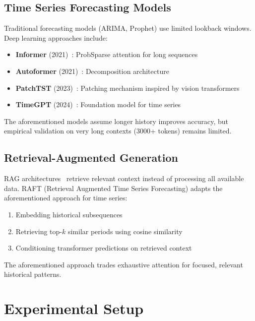 \documentclass[10pt,twocolumn,letterpaper]{article}
\begin{document}
\subsection{Time Series Forecasting Models}
Traditional forecasting models (ARIMA, Prophet) use limited lookback windows. Deep learning approaches include:
\begin{itemize}
    \item \textbf{Informer} (2021)~\cite{informer}: ProbSparse attention for long sequences
    \item \textbf{Autoformer} (2021)~\cite{autoformer}: Decomposition architecture
    \item \textbf{PatchTST} (2023)~\cite{patchtst}: Patching mechanism inspired by vision transformers
    \item \textbf{TimeGPT} (2024)~\cite{timegpt}: Foundation model for time series
\end{itemize}

The aforementioned models assume longer history improves accuracy, but empirical validation on very long contexts (3000+ tokens) remains limited.

\subsection{Retrieval-Augmented Generation}
RAG architectures~\cite{rag} retrieve relevant context instead of processing all available data. RAFT (Retrieval Augmented Time Series Forecasting) adapts the aforementioned approach for time series:
\begin{enumerate}
    \item Embedding historical subsequences
    \item Retrieving top-$k$ similar periods using cosine similarity
    \item Conditioning transformer predictions on retrieved context
\end{enumerate}

The aforementioned approach trades exhaustive attention for focused, relevant historical patterns.

\section{Experimental Setup}
\end{document}
